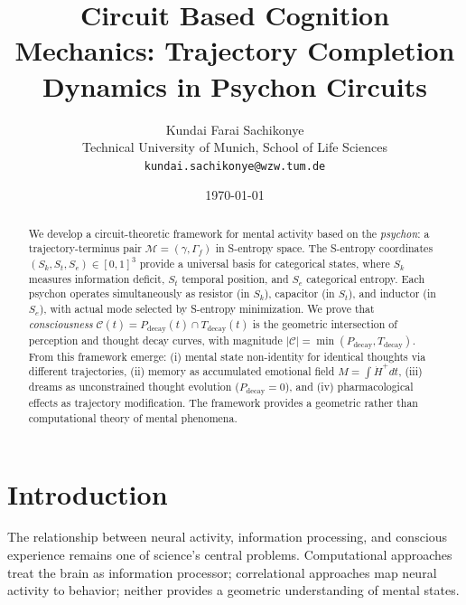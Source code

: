 \documentclass[twocolumn,amsmath,amssymb,aps,prl,superscriptaddress]{revtex4-2}
\newcommand{\Sk}{S_k}
\newcommand{\St}{S_t}
\newcommand{\Se}{S_e}
\newcommand{\Mstate}{\mathcal{M}}
\newcommand{\Ccat}{\mathcal{C}}
\newcommand{\Pdecay}{P_{\text{decay}}}
\newcommand{\Tdecay}{T_{\text{decay}}}
\newcommand{\Hfield}{H}
\newcommand{\Gstate}{\Gamma}
\newcommand{\traj}{\gamma}
\begin{document}
\title{Circuit Based Cognition Mechanics: Trajectory Completion Dynamics in Psychon Circuits}

\author{
Kundai Farai Sachikonye\\
Technical University of Munich, School of Life Sciences\\
\texttt{kundai.sachikonye@wzw.tum.de}
}

\date{\today}

\begin{abstract}
We develop a circuit-theoretic framework for mental activity based on the \emph{psychon}: a trajectory-terminus pair $\Mstate = (\traj, \Gstate_f)$ in S-entropy space. The S-entropy coordinates $(\Sk, \St, \Se) \in [0,1]^3$ provide a universal basis for categorical states, where $\Sk$ measures information deficit, $\St$ temporal position, and $\Se$ categorical entropy. Each psychon operates simultaneously as resistor (in $\Sk$), capacitor (in $\St$), and inductor (in $\Se$), with actual mode selected by S-entropy minimization. We prove that \emph{consciousness} $\Ccat(t) = \Pdecay(t) \cap \Tdecay(t)$ is the geometric intersection of perception and thought decay curves, with magnitude $|\Ccat| = \min(\Pdecay, \Tdecay)$. From this framework emerge: (i) mental state non-identity for identical thoughts via different trajectories, (ii) memory as accumulated emotional field $M = \int \dot{\Hfield}^+ dt$, (iii) dreams as unconstrained thought evolution ($\Pdecay = 0$), and (iv) pharmacological effects as trajectory modification. The framework provides a geometric rather than computational theory of mental phenomena.
\end{abstract}

\maketitle

\section{Introduction}

The relationship between neural activity, information processing, and conscious experience remains one of science's central problems. Computational approaches treat the brain as information processor; correlational approaches map neural activity to behavior; neither provides a geometric understanding of mental states.
\end{document}

